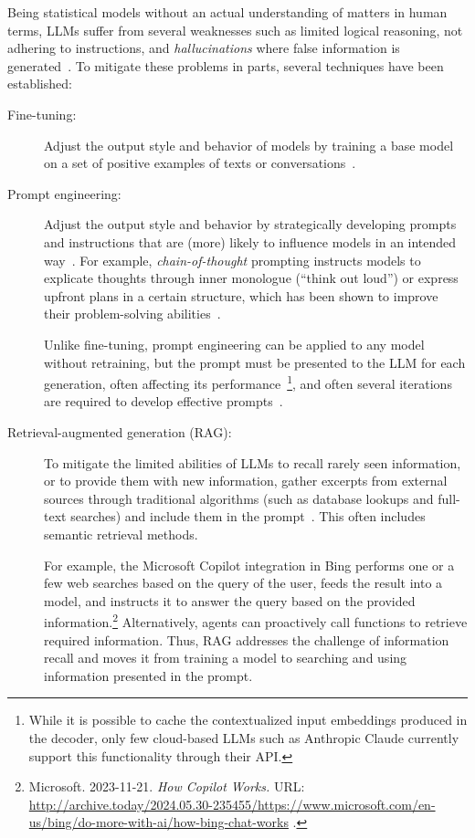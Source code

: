 Being statistical models without an actual understanding of matters in human terms, LLMs suffer from several weaknesses such as limited logical reasoning, not adhering to instructions, and \emph{hallucinations} where false information is generated~\cite{openai2024gpt4}.
To mitigate these problems in parts, several techniques have been established:
%
\begin{description}
	\item[Fine-tuning:] Adjust the output style and behavior of models by training a base model on a set of positive examples of texts or conversations~\cite{kojima2022large,wei2022finetuned}.

	\item[Prompt engineering:] Adjust the output style and behavior by strategically developing prompts and instructions that are (more) likely to influence models in an intended way~\cite{white2023prompt}.
	For example, \emph{chain-of-thought} prompting instructs models to explicate thoughts through inner monologue (``think out loud'') or express upfront plans in a certain structure, which has been shown to improve their problem-solving abilities~\cite{wei2023chainofthought}.

	Unlike fine-tuning, prompt engineering can be applied to any model without retraining, but the prompt must be presented to the LLM for each generation, often affecting its performance~\cite{zhao2023survey}\footnote{While it is possible to cache the contextualized input embeddings produced in the decoder, only few cloud-based LLMs such as Anthropic Claude currently support this functionality through their API.}, and often several iterations are required to develop effective prompts~\cite{white2023prompt}.

	\item[Retrieval-augmented generation (RAG):] To mitigate the limited abilities of LLMs to recall rarely seen information, or to provide them with new information, gather excerpts from external sources through traditional algorithms (such as database lookups and full-text searches) and include them in the prompt~\cite{lewis2020retrieval}.
	This often includes semantic retrieval methods.

	For example, the Microsoft Copilot integration in Bing performs one or a few web searches based on the query of the user, feeds the result into a \gptfouro model, and instructs it to answer the query based on the provided information.\footnote{
		Microsoft. 2023-11-21. \emph{How Copilot Works.}
		URL:
		\url{http://archive.today/2024.05.30-235455/https://www.microsoft.com/en-us/bing/do-more-with-ai/how-bing-chat-works}%
		.
	}
	Alternatively, agents can proactively call functions to retrieve required information.
	Thus, RAG addresses the challenge of information recall and moves it from training a model to searching and using information presented in the prompt.
\end{description}

